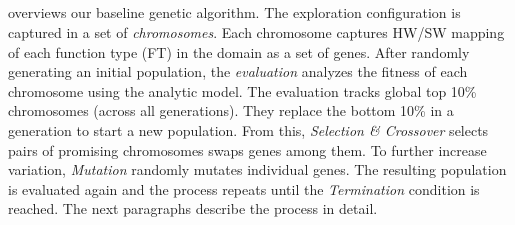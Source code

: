 \subsection{\garand}


	

 overviews our baseline genetic algorithm. The exploration configuration is captured in a set of \emph{chromosomes}. Each chromosome captures HW/SW mapping of each function type (FT) in the domain as a set of genes. After randomly generating an initial population, the \emph{evaluation} analyzes the fitness of each chromosome using the analytic model. The evaluation tracks global top 10\% chromosomes (across all generations). They replace the bottom 10\% in a generation to start a new population. From this, \emph{Selection \& Crossover} selects pairs of promising chromosomes swaps genes among them. To further increase variation, \emph{Mutation} randomly mutates individual genes. The resulting population is evaluated again and the process repeats until the \emph{Termination} condition is reached. The next paragraphs describe the process in detail. 

